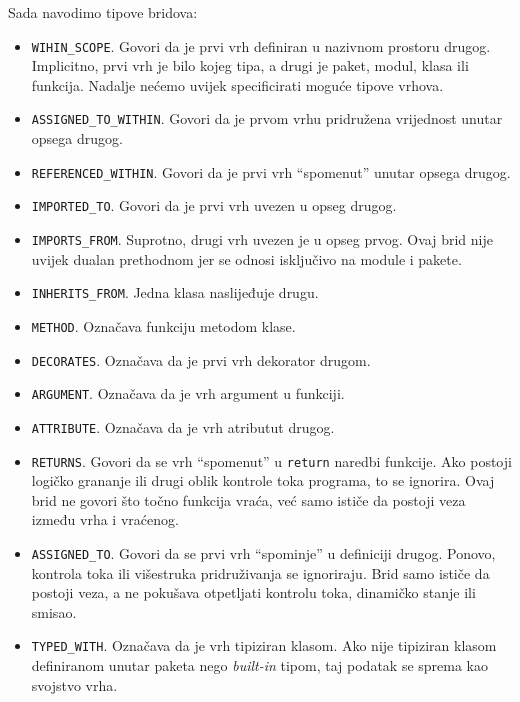 Sada navodimo tipove bridova:
\begin{itemize}
\item \texttt{WIHIN_SCOPE}. Govori da je prvi vrh definiran u nazivnom prostoru drugog. Implicitno, prvi vrh je bilo kojeg tipa, a
drugi je paket, modul, klasa ili funkcija. Nadalje nećemo uvijek specificirati moguće tipove vrhova.

\item \texttt{ASSIGNED_TO_WITHIN}. Govori da je prvom vrhu pridružena vrijednost unutar opsega drugog.
\item \texttt{REFERENCED_WITHIN}. Govori da je prvi vrh \enquote{spomenut} unutar opsega drugog.

\item \texttt{IMPORTED_TO}. Govori da je prvi vrh uvezen u opseg drugog.
\item \texttt{IMPORTS_FROM}. Suprotno, drugi vrh uvezen je u opseg prvog. Ovaj brid nije uvijek
dualan prethodnom jer se odnosi isključivo na module i pakete.

\item \texttt{INHERITS_FROM}. Jedna klasa naslijeđuje drugu.

\item \texttt{METHOD}. Označava funkciju metodom klase.
\item \texttt{DECORATES}. Označava da je prvi vrh dekorator drugom.
\item \texttt{ARGUMENT}. Označava da je vrh argument u funkciji.

\item \texttt{ATTRIBUTE}. Označava da je vrh atributut drugog.

\item \texttt{RETURNS}. Govori da se vrh \enquote{spomenut} u \texttt{return} naredbi funkcije. Ako postoji
logičko grananje ili drugi oblik kontrole toka programa, to se ignorira. Ovaj brid ne govori
što točno funkcija vraća, već samo ističe da postoji veza između vrha i vraćenog.
\item \texttt{ASSIGNED_TO}. Govori da se prvi vrh \enquote{spominje} u definiciji drugog. Ponovo,
kontrola toka ili višestruka pridruživanja se ignoriraju. Brid samo ističe da postoji veza,
a ne pokušava otpetljati kontrolu toka, dinamičko stanje ili smisao.

\item \texttt{TYPED_WITH}. Označava da je vrh tipiziran klasom. Ako nije tipiziran klasom
definiranom unutar paketa nego \emph{built-in} tipom, taj podatak se sprema kao svojstvo vrha.

\end{itemize}

